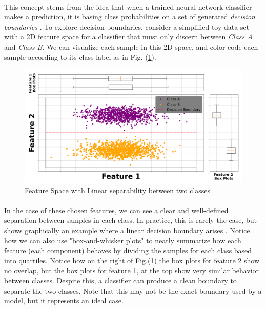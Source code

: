 \documentclass[12pt,letterpaper]{article}
\begin{document}
\paragraph*{}This concept stems from the idea that when a trained neural network classifier makes a prediction, it is basing class probabilities on a set of generated \textit{decision boundaries} \cite{Geron,James}. To explore decision boundaries, consider a simplified toy data set with a 2D feature space for a classifier that must only discern between \textit{Class A} and \textit{Class B}. We can visualize each sample in this 2D space, and color-code each sample according to its class label as in Fig. (\ref{fig-LinSep1}).

\begin{figure}[H]
\begin{center}
\includegraphics[scale=0.35]{../MakeFigures/LinearSeparable1}
\end{center}
\caption{Feature Space with Linear separability between two classes}
\label{fig-LinSep1}
\end{figure} 

\paragraph*{}In the case of these chosen features, we can see a clear and well-defined separation between samples in each class. In practice, this is rarely the case, but shows graphically an example where a linear decision boundary arises \cite{James}. Notice how we can also use "box-and-whisker plots" to neatly summarize how each feature (each component) behaves by dividing the samples for each class based into quartiles. Notice how on the right of Fig.(\ref{fig-LinSep1}) the box plots for feature 2 show no overlap, but the box plots for feature 1, at the top show very similar behavior between classes. Despite this, a classifier can produce a clean boundary to separate the two classes. Note that this may not be the exact boundary used by a model, but it represents an ideal case.
\end{document}
